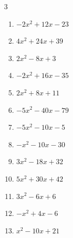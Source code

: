 \begin{multicols}{3}
\begin{enumerate}
  \item $-2x^{2}+12x-23$


  \item $4x^{2}+24x+39$


  \item $2x^{2}-8x+3$


  \item $-2x^{2}+16x-35$


  \item $2x^{2}+8x+11$


\columnbreak %

\resetques

  \item $-5x^{2}-40x-79$


  \item $-5x^{2}-10x-5$


  \item $-x^{2}-10x-30$


  \item $3x^{2}-18x+32$


  \item $5x^{2}+30x+42$


  \item $3x^{2}-6x+6$


  \item $-x^{2}+4x-6$


  \item $x^{2}-10x+21$



\end{enumerate}
\end{multicols}
